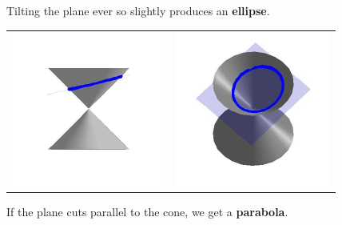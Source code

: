 \pagebreak

Tilting the plane ever so slightly produces an  \textbf{ellipse}.

\begin{center}

\begin{tabular}{cc}

\includegraphics[width=2in]{./IntrotoConicsGraphics/Ellipse01.jpg} & \includegraphics[width=2in]{./IntrotoConicsGraphics/Ellipse02.jpg} \\

\end{tabular}

\end{center}

If the plane cuts parallel to the cone, we get a  \textbf{parabola}.

